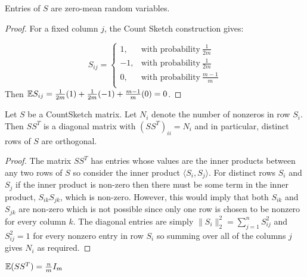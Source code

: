 \begin{Lemma} \label{lem: zero-mean}
  Entries of $S$ are zero-mean random variables.
\end{Lemma}

\begin{proof}
  For a fixed column $j$, the Count Sketch construction gives:

  \begin{equation}
    S_{ij}=
    \begin{cases}
      1, & \text{with probability}\ \frac{1}{2m} \\
      -1, & \text{with probability}\ \frac{1}{2m} \\
      0, & \text{with probability}\ \frac{m-1}{m} \\
    \end{cases}
  \end{equation}
  Then $\mathbb{E} S_{ij} = \frac{1}{2m}(1) + \frac{1}{2m}(-1) + \frac{m-1}{m}(0) = 0$.
\end{proof}

\begin{Lemma} \label{lem: orthogonal_rows}
  Let $S$ be a CountSketch matrix.
  Let $N_i$ denote the number of nonzeros in row $S_i$.
  Then $SS^T$ is a diagonal matrix with $(SS^T)_{ii} = N_i$ and in particular,
  distinct rows of $S$ are orthogonal.
\end{Lemma}

\begin{proof}
  The matrix $SS^T$ has entries whose values are the inner products between any
  two rows of $S$ so consider the inner product $\langle S_i, S_j \rangle$.
  For distinct rows $S_i$ and $S_j$ if the inner product is non-zero then there
  must be some term in the inner product, $S_{ik} S_{jk}$, which is non-zero.
  However, this would imply that both $S_{ik}$ and $S_{jk}$ are non-zero which
  is not possible since only one row is chosen to be nonzero for every column
  $k$.
  The diagonal entries are simply $\| S_i \|_2^2 = \sum_{j=1}^n S_{ij}^2$ and
  $S_{ij}^2 = 1$ for every nonzero entry in row $S_i$ so summing over all of
  the columns $j$ gives $N_i$ as required.
\end{proof}

\begin{Lemma}
  $\mathbb{E}(SS^T) = \frac{n}{m} I_m$
\end{Lemma}

